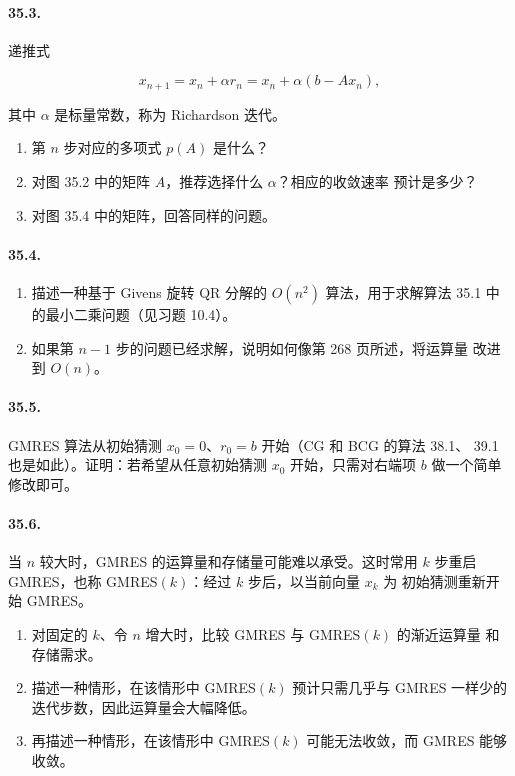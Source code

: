 \documentclass[UTF8,fontset=none,12pt]{ctexart}
\begin{document}
\paragraph{35.3.}
递推式

\[
x_{n+1}=x_n+\alpha r_n
=x_n+\alpha(b-Ax_n),
\]

其中 $\alpha$ 是标量常数，称为 Richardson 迭代。
\begin{enumerate}[label=(\alph*)]
\item 第 $n$ 步对应的多项式 $p(A)$ 是什么？
\item 对图 35.2 中的矩阵 $A$，推荐选择什么 $\alpha$？相应的收敛速率
预计是多少？
\item 对图 35.4 中的矩阵，回答同样的问题。
\end{enumerate}

\paragraph{35.4.}
\begin{enumerate}[label=(\alph*)]
\item 描述一种基于 Givens 旋转 QR 分解的 $O(n^2)$ 算法，用于求解算法 35.1
中的最小二乘问题（见习题 10.4）。
\item 如果第 $n-1$ 步的问题已经求解，说明如何像第 268 页所述，将运算量
改进到 $O(n)$。
\end{enumerate}

\paragraph{35.5.}
GMRES 算法从初始猜测 $x_0=0$、$r_0=b$ 开始（CG 和 BCG 的算法 38.1、
39.1 也是如此）。证明：若希望从任意初始猜测 $x_0$ 开始，只需对右端项
$b$ 做一个简单修改即可。

\paragraph{35.6.}
当 $n$ 较大时，GMRES 的运算量和存储量可能难以承受。这时常用
$k$ 步重启 GMRES，也称 GMRES$(k)$：经过 $k$ 步后，以当前向量 $x_k$ 为
初始猜测重新开始 GMRES。
\begin{enumerate}[label=(\alph*)]
\item 对固定的 $k$、令 $n$ 增大时，比较 GMRES 与 GMRES$(k)$ 的渐近运算量
和存储需求。
\item 描述一种情形，在该情形中 GMRES$(k)$ 预计只需几乎与 GMRES 一样少的
迭代步数，因此运算量会大幅降低。
\item 再描述一种情形，在该情形中 GMRES$(k)$ 可能无法收敛，而 GMRES
能够收敛。
\end{enumerate}
\end{document}
